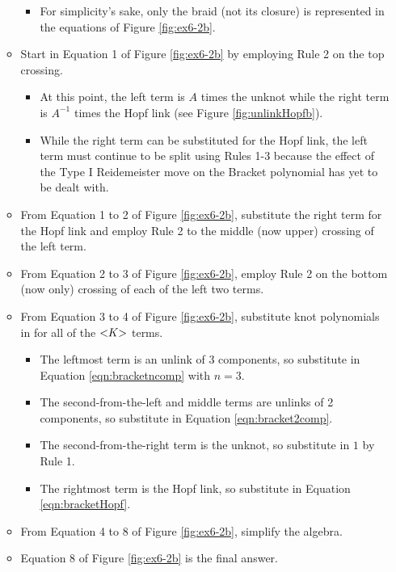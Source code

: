 \documentclass[titlepage]{article}
\numberwithin{figure}{section}
\numberwithin{table}{section}
\numberwithin{equation}{section}
\newcommand{\lbq}{<\hspace{-3pt}}
\newcommand{\rbq}{\hspace{-3pt}>}
\begin{document}
\begin{itemize}
\begin{itemize}
        \begin{itemize}
            \item For simplicity's sake, only the braid (not its closure) is represented in the equations of Figure \ref{fig:ex6-2b}.
        \end{itemize}
        \item Start in Equation 1 of Figure \ref{fig:ex6-2b} by employing Rule 2 on the top crossing.
        \begin{itemize}
            \item At this point, the left term is $A$ times the unknot while the right term is $A^{-1}$ times the Hopf link (see Figure \ref{fig:unlinkHopfb}).
            \item While the right term can be substituted for the Hopf link, the left term must continue to be split using Rules 1-3 because the effect of the Type I Reidemeister move on the Bracket polynomial has yet to be dealt with.
        \end{itemize}
        \item From Equation 1 to 2 of Figure \ref{fig:ex6-2b}, substitute the right term for the Hopf link and employ Rule 2 to the middle (now upper) crossing of the left term.
        \item From Equation 2 to 3 of Figure \ref{fig:ex6-2b}, employ Rule 2 on the bottom (now only) crossing of each of the left two terms.
        \item From Equation 3 to 4 of Figure \ref{fig:ex6-2b}, substitute knot polynomials in for all of the $\lbq K\rbq$ terms.
        \begin{itemize}
            \item The leftmost term is an unlink of 3 components, so substitute in Equation \ref{eqn:bracketncomp} with $n=3$.
            \item The second-from-the-left and middle terms are unlinks of 2 components, so substitute in Equation \ref{eqn:bracket2comp}.
            \item The second-from-the-right term is the unknot, so substitute in $1$ by Rule 1.
            \item The rightmost term is the Hopf link, so substitute in Equation \ref{eqn:bracketHopf}.
        \end{itemize}
        \item From Equation 4 to 8 of Figure \ref{fig:ex6-2b}, simplify the algebra.
        \item Equation 8 of Figure \ref{fig:ex6-2b} is the final answer.

\end{itemize}
\end{itemize}
\end{document}

